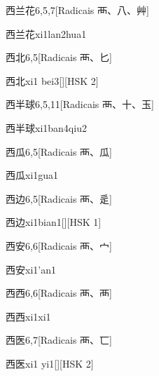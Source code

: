 \begin{entry}{西兰花}{6,5,7}[Radicais ⾑、⼋、⾋]
  \begin{phonetics}{西兰花}{xi1lan2hua1}
  \end{phonetics}
\end{entry}

\begin{entry}{西北}{6,5}[Radicais ⾑、⼔]
  \begin{phonetics}{西北}{xi1 bei3}[][HSK 2]
  \end{phonetics}
\end{entry}

\begin{entry}{西半球}{6,5,11}[Radicais ⾑、⼗、⽟]
  \begin{phonetics}{西半球}{xi1ban4qiu2}
  \end{phonetics}
\end{entry}

\begin{entry}{西瓜}{6,5}[Radicais ⾑、⽠]
  \begin{phonetics}{西瓜}{xi1gua1}
  \end{phonetics}
\end{entry}

\begin{entry}{西边}{6,5}[Radicais ⾑、⾡]
  \begin{phonetics}{西边}{xi1bian1}[][HSK 1]
  \end{phonetics}
\end{entry}

\begin{entry}{西安}{6,6}[Radicais ⾑、⼧]
  \begin{phonetics}{西安}{xi1'an1}
  \end{phonetics}
\end{entry}

\begin{entry}{西西}{6,6}[Radicais ⾑、⾑]
  \begin{phonetics}{西西}{xi1xi1}
  \end{phonetics}
\end{entry}

\begin{entry}{西医}{6,7}[Radicais ⾑、⼖]
  \begin{phonetics}{西医}{xi1 yi1}[][HSK 2]
  \end{phonetics}
\end{entry}

